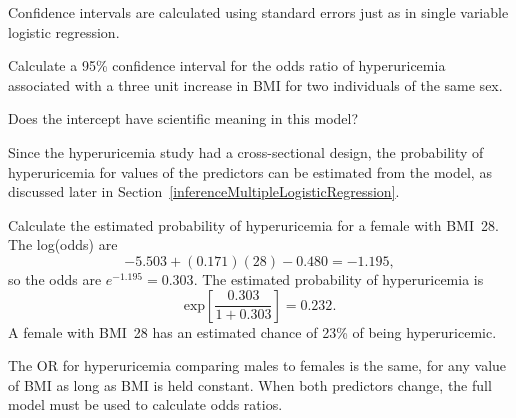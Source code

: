 Confidence intervals are calculated using standard errors just as in single variable logistic regression.

\begin{exercisewrap}
  \begin{nexercise}
    Calculate a 95\% confidence interval for the odds ratio of hyperuricemia associated with a three unit increase in BMI for two individuals of the same sex.     \footnotemark{}
  \end{nexercise}
\end{exercisewrap}

\begin{exercisewrap}
\begin{nexercise}
Does the intercept have scientific meaning in this model? \footnotemark{}
\end{nexercise}
\end{exercisewrap}

Since the hyperuricemia study had a cross-sectional design, the probability of hyperuricemia for values of the predictors can be estimated from the model, as discussed later in Section~\ref{inferenceMultipleLogisticRegression}.

\begin{examplewrap} 
\begin{nexample}{Calculate the estimated probability of hyperuricemia for a female with BMI~28.}
The log(odds) are
\[
    -5.503 + (0.171)(28)  - 0.480 = -1.195,
\]
so the odds are $e^{-1.195} = 0.303$.  The estimated probability of hyperuricemia is
\[
   \text{exp}  \left[ \frac{0.303}{1 + 0.303} \right] = 0.232.
\]
A female with BMI~28 has an estimated chance of 23\% of being hyperuricemic.

\label{example:huBMISexProbabilities}
\end{nexample}
\end{examplewrap}

The OR for hyperuricemia comparing males to females is the same, for any value of BMI as long as BMI is held constant. When both predictors change, the full model must be used to calculate odds ratios.

